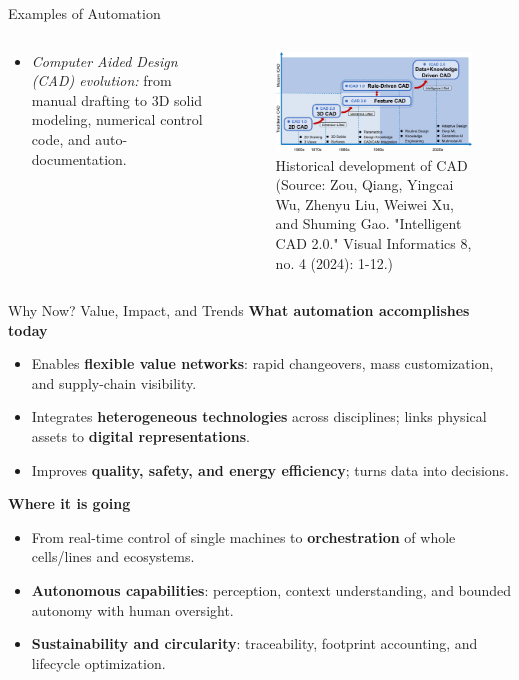 \begin{frame}{Examples of Automation}
	\begin{columns}
		\begin{column}{0.25\textwidth}
			\begin{itemize}
				\item \emph{Computer Aided Design (CAD) evolution:} from manual drafting to 3D solid modeling, numerical control code, and auto-documentation.
			\end{itemize}
		\end{column}
		\begin{column}{0.75\textwidth}
				\begin{figure}
				\centering
				\includegraphics[width=0.8\linewidth]{fig/lec01/CAD_development.jpg}
				\caption*{Historical development of CAD (Source: Zou, Qiang, Yingcai Wu, Zhenyu Liu, Weiwei Xu, and Shuming Gao. "Intelligent CAD 2.0." Visual Informatics 8, no. 4 (2024): 1-12.)}
			\end{figure}
		\end{column}
\end{columns}
\end{frame}




\begin{frame}{Why Now? Value, Impact, and Trends}
\textbf{What automation accomplishes today}
\begin{itemize}
  \item Enables \textbf{flexible value networks}: rapid changeovers, mass customization, and supply-chain visibility.
  \item Integrates \textbf{heterogeneous technologies} across disciplines; links physical assets to \textbf{digital representations}.
  \item Improves \textbf{quality, safety, and energy efficiency}; turns data into decisions.
\end{itemize}

\textbf{Where it is going}
\begin{itemize}
  \item From real-time control of single machines to \textbf{orchestration} of whole cells/lines and ecosystems.
  \item \textbf{Autonomous capabilities}: perception, context understanding, and bounded autonomy with human oversight.
  \item \textbf{Sustainability and circularity}: traceability, footprint accounting, and lifecycle optimization.
\end{itemize}
\end{frame}


